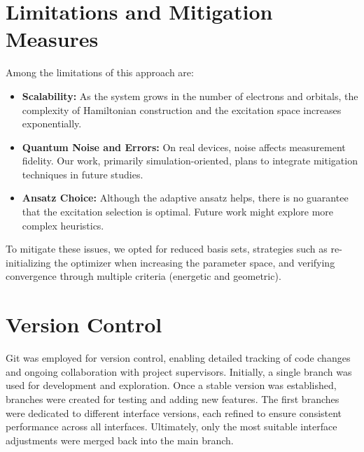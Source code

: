 \section{Limitations and Mitigation Measures}

Among the limitations of this approach are:
\begin{itemize}
    \item \textbf{Scalability:} As the system grows in the number of electrons and orbitals, the complexity of Hamiltonian construction and the excitation space increases exponentially.
    \item \textbf{Quantum Noise and Errors:} On real devices, noise affects measurement fidelity. Our work, primarily simulation-oriented, plans to integrate mitigation techniques in future studies.
    \item \textbf{Ansatz Choice:} Although the adaptive ansatz helps, there is no guarantee that the excitation selection is optimal. Future work might explore more complex heuristics.
\end{itemize}

To mitigate these issues, we opted for reduced basis sets, strategies such as re-initializing the optimizer when increasing the parameter space, and verifying convergence through multiple criteria (energetic and geometric).

\section{Version Control}
Git was employed for version control, enabling detailed tracking of code changes and ongoing collaboration with project supervisors. Initially, a single branch was used for development and exploration. Once a stable version was established, branches were created for testing and adding new features. The first branches were dedicated to different interface versions, each refined to ensure consistent performance across all interfaces. Ultimately, only the most suitable interface adjustments were merged back into the main branch.